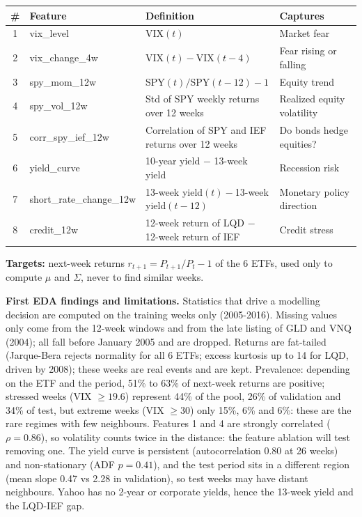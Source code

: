 \documentclass[11pt,a4paper]{article}
\newcommand{\changed}[1]{#1}
\begin{document}
\smallskip
\begin{tabularx}{\linewidth}{@{}clLl@{}}
\toprule
\# & Feature & Definition & Captures\\ & vix\_level & VIX$(t)$ & Market fear\\
2 & vix\_change\_4w & VIX$(t)-$VIX$(t-4)$ & Fear rising or falling\\
3 & spy\_mom\_12w & SPY$(t)/$SPY$(t-12)-1$ & Equity trend\\
4 & spy\_vol\_12w & Std of SPY weekly returns over 12 weeks & Realized equity volatility\\
5 & corr\_spy\_ief\_12w & Correlation of SPY and IEF returns over 12 weeks & Do bonds hedge equities?\\
6 & yield\_curve & 10-year yield $-$ 13-week yield & Recession risk\\
7 & short\_rate\_change\_12w & 13-week yield$(t)-$13-week yield$(t-12)$ & Monetary policy direction\\
8 & credit\_12w & 12-week return of LQD $-$ 12-week return of IEF & Credit stress\\\bottomrule
\end{tabularx}

\smallskip
\textbf{Targets:} next-week returns $r_{t+1}=P_{t+1}/P_t-1$ of the 6 ETFs, used only to compute $\mu$ and $\Sigma$, never to find similar weeks.

\textbf{First EDA findings and limitations.} \changed{Statistics that drive a modelling decision are computed on the training weeks only (2005-2016).}
\changed{Missing values only come from the 12-week windows and from the late listing of GLD and VNQ (2004); all fall before January 2005 and are dropped.}
Returns are fat-tailed (Jarque-Bera rejects normality for all 6 ETFs; excess
kurtosis up to \changed{14 for LQD, driven by 2008}); these weeks are real events and are kept. \changed{Prevalence: depending on the ETF and the period, 51\% to 63\% of next-week returns are positive; stressed weeks (VIX $\ge 19.6$) represent 44\% of the pool, 26\% of validation and 34\% of test, but extreme weeks (VIX $\ge 30$) only 15\%, 6\% and 6\%: these are the rare regimes with few neighbours.} Features 1 and 4 are
strongly correlated (\changed{$\rho=0.86$}), so volatility counts twice in the distance: the feature ablation will test removing one.
The yield curve is persistent (autocorrelation \changed{0.80} at 26 weeks) and non-stationary (ADF \changed{$p=0.41$}), and the test
period sits in a different region (mean slope 0.47 vs 2.28 in validation), so test weeks may have distant neighbours.
Yahoo has no 2-year or corporate yields, hence the 13-week yield and the LQD-IEF gap.
\end{document}

